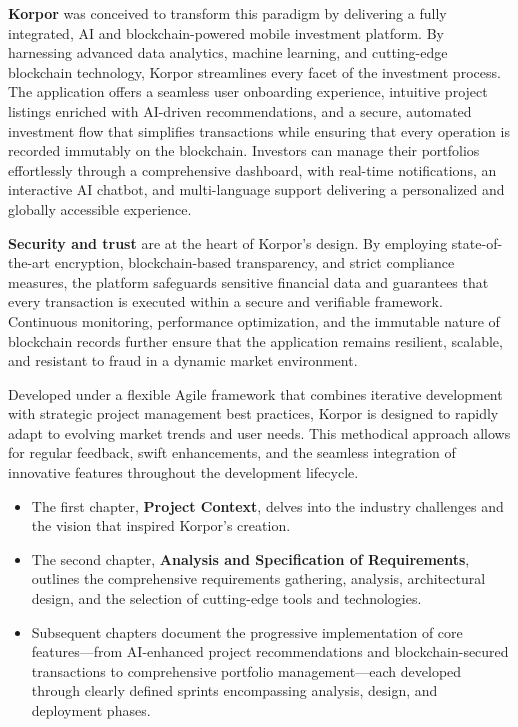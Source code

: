 \noindent \textbf{\textcolor{primary}{Korpor}} was conceived to transform this paradigm by delivering a fully integrated, AI and blockchain-powered mobile investment platform. By harnessing advanced data analytics, machine learning, and cutting-edge blockchain technology, Korpor streamlines every facet of the investment process. The application offers a seamless user onboarding experience, intuitive project listings enriched with AI-driven recommendations, and a secure, automated investment flow that simplifies transactions while ensuring that every operation is recorded immutably on the blockchain. Investors can manage their portfolios effortlessly through a comprehensive dashboard, with real-time notifications, an interactive AI chatbot, and multi-language support delivering a personalized and globally accessible experience.

\noindent \textbf{\textcolor{primary}{Security and trust}} are at the heart of Korpor's design. By employing state-of-the-art encryption, blockchain-based transparency, and strict compliance measures, the platform safeguards sensitive financial data and guarantees that every transaction is executed within a secure and verifiable framework. Continuous monitoring, performance optimization, and the immutable nature of blockchain records further ensure that the application remains resilient, scalable, and resistant to fraud in a dynamic market environment.

\noindent Developed under a flexible Agile framework that combines iterative development with strategic project management best practices, Korpor is designed to rapidly adapt to evolving market trends and user needs. This methodical approach allows for regular feedback, swift enhancements, and the seamless integration of innovative features throughout the development lifecycle.



\begin{itemize}[leftmargin=1.5em, itemsep=0pt, parsep=0pt, topsep=0.05cm]
\item The first chapter, \textbf{\textcolor{primary}{Project Context}}, delves into the industry challenges and the vision that inspired Korpor's creation.
\item The second chapter, \textbf{\textcolor{primary}{Analysis and Specification of Requirements}}, outlines the comprehensive requirements gathering, analysis, architectural design, and the selection of cutting-edge tools and technologies.
\item Subsequent chapters document the progressive implementation of core features—from AI-enhanced project recommendations and blockchain-secured transactions to comprehensive portfolio management—each developed through clearly defined sprints encompassing analysis, design, and deployment phases.
\end{itemize}

